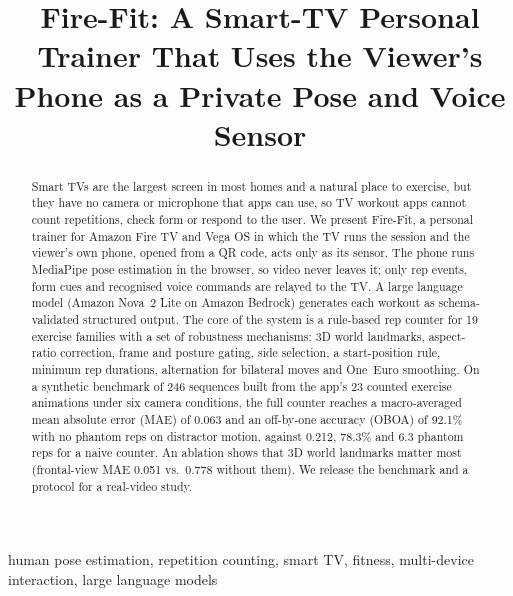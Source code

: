 \documentclass[conference]{IEEEtran}
\newcommand{\todo}[1]{\textcolor{red}{[#1]}}
\begin{document}
\title{Fire-Fit: A Smart-TV Personal Trainer That Uses the Viewer's Phone as a Private Pose and Voice Sensor}

\author{\IEEEauthorblockN{\todo{Author Name}}
\IEEEauthorblockA{\todo{Department, Institution}\\
\todo{City, Country}\\
\todo{e-mail}}}

\maketitle

\begin{abstract}
Smart TVs are the largest screen in most homes and a natural place to exercise, but
they have no camera or microphone that apps can use, so TV workout apps cannot count
repetitions, check form or respond to the user. We present Fire-Fit, a personal
trainer for Amazon Fire TV and Vega OS in which the TV runs the session and the
viewer's own phone, opened from a QR code, acts only as its sensor. The phone runs
MediaPipe pose estimation in the browser, so video never leaves it; only rep events,
form cues and recognised voice commands are relayed to the TV. A large language model
(Amazon Nova~2 Lite on Amazon Bedrock) generates each workout as schema-validated
structured output. The core of the system is a rule-based rep counter for 19 exercise
families with a set of robustness mechanisms: 3D world landmarks, aspect-ratio
correction, frame and posture gating, side selection, a start-position rule, minimum
rep durations, alternation for bilateral moves and One~Euro smoothing. On a synthetic
benchmark of 246 sequences built from the app's 23 counted exercise animations under
six camera conditions, the full counter reaches a macro-averaged mean absolute error
(MAE) of 0.063 and an off-by-one accuracy (OBOA) of 92.1\% with no phantom reps on
distractor motion, against 0.212, 78.3\% and 6.3 phantom reps for a naive counter.
An ablation shows that 3D world landmarks matter most (frontal-view MAE 0.051 vs.\
0.778 without them). We release the benchmark and a protocol for a real-video study.
\end{abstract}

\begin{IEEEkeywords}
human pose estimation, repetition counting, smart TV, fitness, multi-device interaction, large language models
\end{IEEEkeywords}
\end{document}
